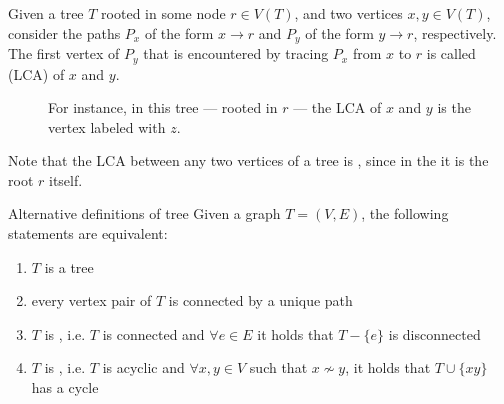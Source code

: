 \documentclass[a4paper, 12pt]{report}
\begin{document}
    Given a tree $T$ rooted in some node $r \in V(T)$, and two vertices $x, y \in V(T)$, consider the paths $P_x$ of the form $x \to r$ and $P_y$ of the form $y \to r$, respectively. The first vertex of $P_y$ that is encountered by tracing $P_x$ from $x$ to $r$ is called  (LCA) of $x$ and $y$.

    \begin{figure}[H]
        \centering
        \caption{For instance, in this tree --- rooted in $r$ --- the LCA of $x$ and $y$ is the vertex labeled with $z$.}
    \end{figure}

    Note that the LCA between any two vertices of a tree is , since in the  it is the root $r$ itself.

    \begin{framedthm}[label={tree alt}]{Alternative definitions of tree}
        Given a graph $T = (V, E)$, the following statements are equivalent:

        \begin{enumerate}
            \item $T$ is a tree
            \item every vertex pair of $T$ is connected by a unique path
            \item $T$ is , i.e. $T$ is connected and $\forall e \in E$ it holds that $T- \{e\}$ is disconnected
            \item $T$ is , i.e. $T$ is acyclic and $\forall x, y \in V$ such that $x \nsim y$, it holds that $T \cup \{xy\}$ has a cycle
        \end{enumerate}
    \end{framedthm}
\end{document}
